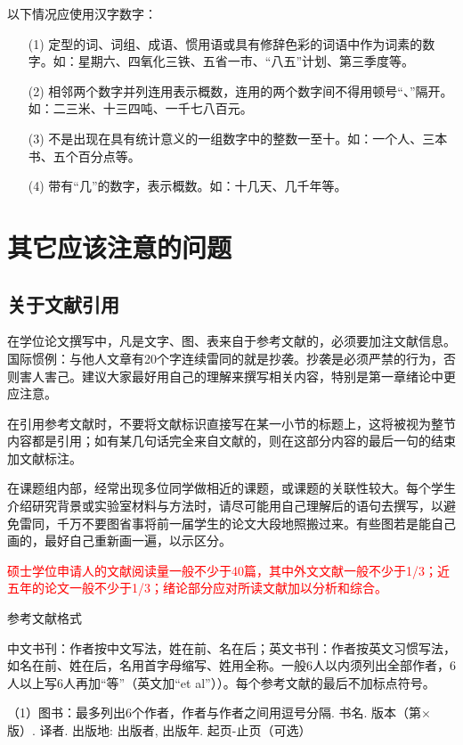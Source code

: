 以下情况应使用汉字数字：
\begin{enumerate}
    \item[(1)] 定型的词、词组、成语、惯用语或具有修辞色彩的词语中作为词素的数字。如：星期六、四氧化三铁、五省一市、“八五”计划、第三季度等。
    \item[(2)] 相邻两个数字并列连用表示概数，连用的两个数字间不得用顿号“、”隔开。如：二三米、十三四吨、一千七八百元。
    \item[(3)] 不是出现在具有统计意义的一组数字中的整数一至十。如：一个人、三本书、五个百分点等。
    \item[(4)] 带有“几”的数字，表示概数。如：十几天、几千年等。
\end{enumerate}

\section{其它应该注意的问题}

\subsection{关于文献引用}

在学位论文撰写中，凡是文字、图、表来自于参考文献的，必须要加注文献信息。国际惯例：与他人文章有20个字连续雷同的就是抄袭。抄袭是必须严禁的行为，否则害人害己。建议大家最好用自己的理解来撰写相关内容，特别是第一章绪论中更应注意。

在引用参考文献时，不要将文献标识直接写在某一小节的标题上，这将被视为整节内容都是引用；如有某几句话完全来自文献的，则在这部分内容的最后一句的结束加文献标注。

在课题组内部，经常出现多位同学做相近的课题，或课题的关联性较大。每个学生介绍研究背景或实验室材料与方法时，请尽可能用自己理解后的语句去撰写，以避免雷同，千万不要图省事将前一届学生的论文大段地照搬过来。有些图若是能自己画的，最好自己重新画一遍，以示区分。

\textcolor{red}{硕士学位申请人的文献阅读量一般不少于40篇，其中外文文献一般不少于1/3；近五年的论文一般不少于1/3；绪论部分应对所读文献加以分析和综合。}

参考文献格式

中文书刊：作者按中文写法，姓在前、名在后；英文书刊：作者按英文习惯写法，如名在前、姓在后，名用首字母缩写、姓用全称。一般6人以内须列出全部作者，6人以上写6人再加“等”（英文加“et al”））。每个参考文献的最后不加标点符号。

（1）图书：最多列出6个作者，作者与作者之间用逗号分隔. 书名. 版本（第×版）. 译者. 出版地: 出版者, 出版年. 起页-止页（可选）

